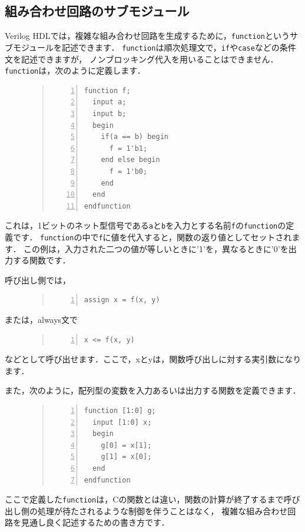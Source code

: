 \documentclass[a4paper,dvipdfmx]{jsarticle}
\begin{document}
\subsection{組み合わせ回路のサブモジュール}
Verilog HDLでは，複雑な組み合わせ回路を生成するために，\verb|function|というサブモジュールを記述できます．
\verb|function|は順次処理文で，\verb|if|や\verb|case|などの条件文を記述できますが，
ノンブロッキング代入を用いることはできません．\verb|function|は，次のように定義します．
\begin{figure}[H]
\begin{quote}
\begin{Verbatim}[frame=single, numbers=left, baselinestretch=0.8]
function f;
  input a;
  input b;
  begin
    if(a == b) begin
      f = 1'b1;
    end else begin
      f = 1'b0;
    end
  end
endfunction
\end{Verbatim}
\end{quote}
\end{figure}
これは，1ビットのネット型信号である\verb|a|と\verb|b|を入力とする名前\verb|f|の\verb|function|の定義です．
\verb|function|の中で\verb|f|に値を代入すると，関数の返り値としてセットされます．
この例は，入力された二つの値が等しいときに'1'を，異なるときに'0'を出力する関数です．

呼び出し側では，
\begin{figure}[H]
\begin{quote}
\begin{Verbatim}[frame=single, numbers=left, baselinestretch=0.8]
assign x = f(x, y)
\end{Verbatim}
\end{quote}
\end{figure}
または，always文で
\begin{figure}[H]
\begin{quote}
\begin{Verbatim}[frame=single, numbers=left, baselinestretch=0.8]
x <= f(x, y)
\end{Verbatim}
\end{quote}
\end{figure}
などとして呼び出せます．ここで，xとyは，関数呼び出しに対する実引数になります．

また，次のように，配列型の変数を入力あるいは出力する関数を定義できます．
\begin{figure}[H]
\begin{quote}
\begin{Verbatim}[frame=single, numbers=left, baselinestretch=0.8]
function [1:0] g; 
  input [1:0] x;
  begin
    g[0] = x[1];
    g[1] = x[0];
  end
endfunction
\end{Verbatim}
\end{quote}
\end{figure}
ここで定義した\verb|function|は，Cの関数とは違い，関数の計算が終了するまで呼び出し側の処理が待たされるような制御を伴うことはなく，
複雑な組み合わせ回路を見通し良く記述するための書き方です．
\end{document}
